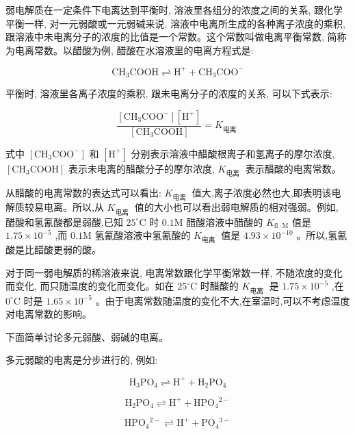 \documentclass[10pt]{article}
\begin{document}
弱电解质在一定条件下电离达到平衡时, 溶液里各组分的浓度之间的关系, 跟化学平衡一样, 对一元弱酸或一元弱碱来说, 溶液中电离所生成的各种离子浓度的乘积, 跟溶液中未电离分子的浓度的比值是一个常数。这个常数叫做电离平衡常数, 简称为电离常数。以醋酸为例, 醋酸在水溶液里的电离方程式是:

\[
{\mathrm{{CH}}}_{3}\mathrm{{COOH}} \rightleftharpoons {\mathrm{H}}^{ + } + {\mathrm{{CH}}}_{3}{\mathrm{{COO}}}^{ - }
\]

平衡时, 溶液里各离子浓度的乘积, 跟未电离分子的浓度的关系, 可以下式表示:

\[
\frac{\left\lbrack {{\mathrm{{CH}}}_{3}{\mathrm{{COO}}}^{ - }}\right\rbrack \left\lbrack {\mathrm{H}}^{ + }\right\rbrack }{\left\lbrack {\mathrm{{CH}}}_{3}\mathrm{{COOH}}\right\rbrack } = {K}_{\text{电离 }}
\]

式中 \(\left\lbrack {{\mathrm{{CH}}}_{3}{\mathrm{{COO}}}^{ - }}\right\rbrack\) 和 \(\left\lbrack {\mathrm{H}}^{ + }\right\rbrack\) 分别表示溶液中醋酸根离子和氢离子的摩尔浓度, \(\left\lbrack {{\mathrm{{CH}}}_{3}\mathrm{{COOH}}}\right\rbrack\) 表示未电离的醋酸分子的摩尔浓度, \({K}_{\text{电离 }}\) 表示醋酸的电离常数。

从醋酸的电离常数的表达式可以看出: \({K}_{\text{电离 }}\) 值大,离子浓度必然也大,即表明该电解质较易电离。所以,从 \({K}_{\text{电离 }}\) 值的大小也可以看出弱电解质的相对强弱。例如, 醋酸和氢氰酸都是弱酸,已知 \({25}^{ \circ }\mathrm{C}\) 时 \({0.1}\mathrm{M}\) 醋酸溶液中醋酸的 \({K}_{\mathrm{{fl}} \cdot \mathrm{M}}\) 值是 \({1.75} \times {10}^{-5}\) ,而 \({0.1}\mathrm{M}\) 氢氰酸溶液中氢氰酸的 \({K}_{\text{电离 }}\) 值是 \({4.93} \times {10}^{-{10}}\) 。所以,氢氰酸是比醋酸更弱的酸。

对于同一弱电解质的稀溶液来说, 电离常数跟化学平衡常数一样, 不随浓度的变化而变化, 而只随温度的变化而变化。如在 \({25}^{ \circ }\mathrm{C}\) 时醋酸的 \({K}_{\text{电离 }}\) 是 \({1.75} \times {10}^{-5}\) ,在 \({0}^{ \circ }\mathrm{C}\) 时是 \({1.65} \times {10}^{-5}\) 。由于电离常数随温度的变化不大,在室温时,可以不考虑温度对电离常数的影响。

下面简单讨论多元弱酸、弱碱的电离。

多元弱酸的电离是分步进行的, 例如:

\[
{\mathrm{H}}_{3}{\mathrm{{PO}}}_{4} \rightleftharpoons {\mathrm{H}}^{ + } + {\mathrm{H}}_{2}{\mathrm{{PO}}}_{4}
\]

\[
{\mathrm{H}}_{2}{\mathrm{{PO}}}_{4} \rightleftharpoons {\mathrm{H}}^{ + } + {\mathrm{{HPO}}}_{4}{}^{2 - }
\]

\[
{\mathrm{{HPO}}}_{4}{}^{2 - } \rightleftharpoons {\mathrm{H}}^{ + } + {\mathrm{{PO}}}_{4}{}^{3 - }
\]
\end{document}
